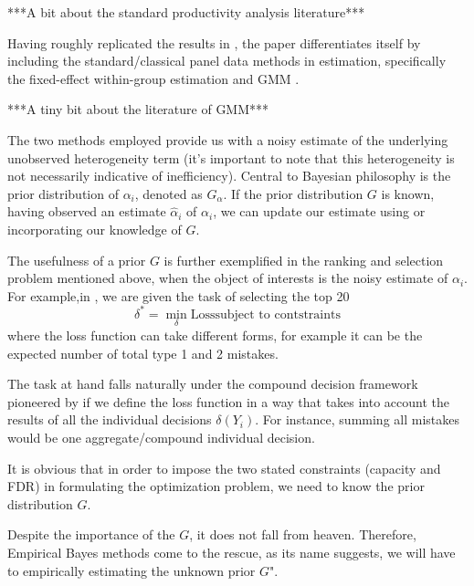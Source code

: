 \documentclass[12pt]{article}
\begin{document}
***A bit about the standard productivity analysis literature***

Having roughly replicated the results in \cite{}, the paper differentiates
itself by including the standard/classical panel data methods in estimation,
specifically the fixed-effect within-group estimation and GMM \cite{}.

***A tiny bit about the literature of GMM***

The two methods employed provide us with a noisy estimate of the underlying
unobserved heterogeneity term (it's important to note that this heterogeneity
is not necessarily indicative of inefficiency). Central to Bayesian philosophy
is the prior distribution of \(\alpha_i\), denoted as \(G_{\alpha}\). If the
prior distribution \(G\) is known, having observed an estimate
\(\hat{\alpha}_i\) of \(\alpha_i\), we can update our estimate using or
incorporating our knowledge of \(G\).

The usefulness of a prior $G$ is further exemplified in the ranking and
selection problem mentioned above, when the object of interests is the noisy
estimate of $\alpha_i$. For example,in \cite{}, we are given the task of
selecting the top 20$$ \delta^* = \min_{\delta} \text{Loss} \text{subject to
        contstraints} $$ where the loss function can take different forms, for example
it can be the expected number of total type 1 and 2 mistakes.%

The task at hand falls naturally under the compound decision framework
pioneered by \cite{} if we define the loss function in a way that takes into
account the results of all the individual decisions $\delta(Y_i)$. For
instance, summing all mistakes would be one aggregate/compound individual
decision.

It is obvious that in order to impose the two stated constraints (capacity and
FDR) in formulating the optimization problem, we need to know the prior
distribution $G$.

Despite the importance of the $G$, it does not fall from heaven. Therefore,
Empirical Bayes methods come to the rescue, as its name suggests, we will have
to empirically estimating the unknown prior \(G\)".
\end{document}
